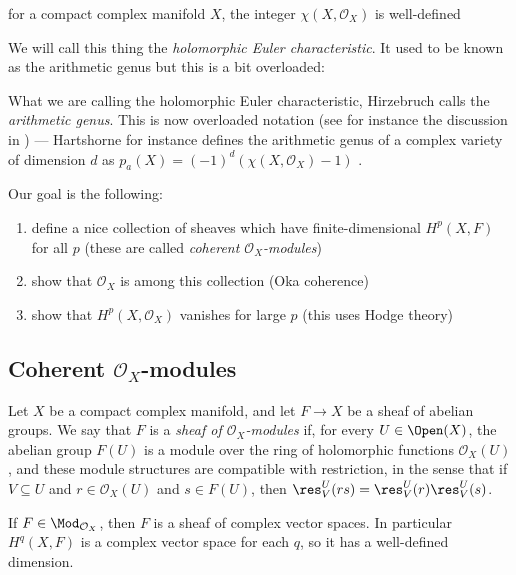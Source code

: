 \documentclass[11pt]{book}
\begin{document}
\begin{center} 
for a compact complex manifold $X$, the integer $\chi(X,\mathcal{O}_X)$ is well-defined
\end{center}

We will call this thing the \emph{holomorphic Euler characteristic}. It used to be known as the arithmetic genus but this is a bit overloaded:

\begin{warning} What we are calling the holomorphic Euler characteristic, Hirzebruch calls the \emph{arithmetic genus}. This is now overloaded notation (see for instance the discussion in \cite[0BY6]{Stacks}) --- Hartshorne for instance defines the arithmetic genus of a complex variety of dimension $d$ as $p_a(X) = (-1)^d \left( \chi(X,\mathcal{O}_X) -1 \right)$ \cite[p.~230]{Hartshorne}.
\end{warning}

Our goal is the following:
\begin{enumerate}
    \item define a nice collection of sheaves which have finite-dimensional $H^p(X,F)$ for all $p$ (these are called \emph{coherent $\mathcal{O}_X$-modules})
    \item show that $\mathcal{O}_X$ is among this collection (Oka coherence)
    \item show that $H^p(X,\mathcal{O}_X)$ vanishes for large $p$ (this uses Hodge theory)
\end{enumerate}

\subsection{Coherent $\mathcal{O}_X$-modules}

\begin{definition} Let $X$ be a compact complex manifold, and let $F \to X$ be a sheaf of abelian groups. We say that $F$ is a \emph{sheaf of $\mathcal{O}_X$-modules} if, for every $U \in \Open(X)$, the abelian group $F(U)$ is a module over the ring of holomorphic functions $\mathcal{O}_X(U)$, and these module structures are compatible with restriction, in the sense that if $V \subseteq U$ and $r\in \mathcal{O}_X(U)$ and $s\in F(U)$, then $\res_V^U(rs) = \res_V^U(r)\res_V^U(s)$.
\end{definition}

\begin{remark} If $F \in \Mod_{\mathcal{O}_X}$, then $F$ is a sheaf of complex vector spaces. In particular $H^q(X,F)$ is a complex vector space for each $q$, so it has a well-defined dimension.
\end{remark}
\end{document}
